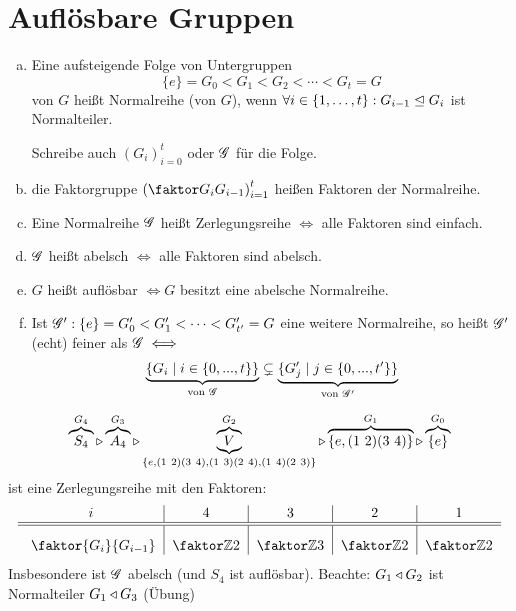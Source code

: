\documentclass[a4paper]{report}
\begin{document}
\section{Auflösbare Gruppen}
\begin{defi} \item
  \begin{enumerate}[(a)]
    \item Eine aufsteigende Folge von Untergruppen
          \[\{e\} = G_{0} < G_{1} < G_{2} < \cdots < G_{t} = G\]
          von $G$ heißt Normalreihe (von $G$), wenn
          $\forall i \in \{1, \ldots, t\} : G_{i-1} \trianglelefteq G_{i}$ ist Normalteiler.

          Schreibe auch $(G_{i})_{i=0}^{t}$ oder $\mathscr{G}$ für die Folge.
    \item die Faktorgruppe $\l(\fak{G_{i}}{G_{i-1}}\r)_{i=1}^{t}$ heißen Faktoren der Normalreihe.
    \item Eine Normalreihe $\mathscr{G}$ heißt Zerlegungsreihe $\iff$ alle Faktoren sind einfach.
    \item $\mathscr{G}$ heißt abelsch $\iff$ alle Faktoren sind abelsch.
    \item $G$ heißt auflösbar $\iff G$ besitzt eine abelsche Normalreihe.
    \item Ist $\mathscr{G}': \{e\} = G_{0}' < G_{1}' < \cdots < G'_{t'} = G$ eine weitere Normalreihe, so heißt $\mathscr{G}'$ (echt) feiner als $\mathscr{G} \iff$
          \[\underbrace{\{G_{i} \mid i \in \{0, ..., t\}\}}_{\text{von } \mathscr{G}} \subsetneq \underbrace{\{G_{j}' \mid j \in \{0, ..., t'\}\}}_{\text{von  }\mathscr{G}'}\]
  \end{enumerate}
\end{defi}
\begin{bsp*}
  \[\obr{S_{4}}^{G_{4}} \etn \obr{A_{4}}^{G_{3}} \etn \ubr{\obr{V}^{G_{2}}}_{\{e, (1\ 2)(3\ 4), (1\ 3)(2\ 4), (1\ 4)(2\ 3)\}} \etn \obr{\{e, (1\ 2)(3\ 4)\}}^{G_{1}} \etn \obr{\{e\}}^{G_{0}}\]
  ist eine Zerlegungsreihe mit den Faktoren:
  \[
  \begin{tabular}{c|c|c|c|c}
    $i$ & $4$ & $3$ & $2$ & $1$ \\
    \hline
    \hline
    \rule{0pt}{4ex}
    $\faktor{G_{i}}{G_{i-1}}$ & $\faktor \Z 2$ & $\faktor \Z 3$ & $\faktor \Z 2$ & $\faktor \Z 2$
  \end{tabular}
\]
Insbesondere ist $\mathscr{G}$ abelsch (und $S_{4}$ ist auflösbar).
Beachte: $G_{1} \triangleleft G_{2}$ ist Normalteiler $G_{1} \triangleleft G_{3}$ (Übung)
\end{bsp*}
\end{document}
